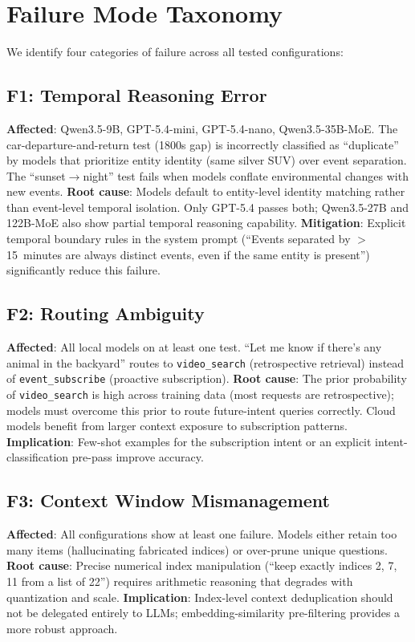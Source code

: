 \documentclass[onecolumn,10pt]{IEEEtran}
\begin{document}

\section{Failure Mode Taxonomy}

We identify four categories of failure across all tested configurations:

\subsection{F1: Temporal Reasoning Error}
\textbf{Affected}: Qwen3.5-9B, GPT-5.4-mini, GPT-5.4-nano, Qwen3.5-35B-MoE.
The car-departure-and-return test (1800s gap) is incorrectly classified
as ``duplicate'' by models that prioritize entity identity (same silver SUV)
over event separation. The ``sunset$\rightarrow$night'' test fails when
models conflate environmental changes with new events.
\textbf{Root cause}: Models default to entity-level identity matching
rather than event-level temporal isolation. Only GPT-5.4 passes both;
Qwen3.5-27B and 122B-MoE also show partial temporal reasoning capability.
\textbf{Mitigation}: Explicit temporal boundary rules in the system
prompt (``Events separated by $>$15~minutes are always distinct events,
even if the same entity is present'') significantly reduce this failure.

\subsection{F2: Routing Ambiguity}
\textbf{Affected}: All local models on at least one test.
``Let me know if there's any animal in the backyard'' routes to
\texttt{video\_search} (retrospective retrieval) instead of
\texttt{event\_subscribe} (proactive subscription).
\textbf{Root cause}: The prior probability of \texttt{video\_search}
is high across training data (most requests are retrospective); models
must overcome this prior to route future-intent queries correctly.
Cloud models benefit from larger context exposure to subscription patterns.
\textbf{Implication}: Few-shot examples for the subscription intent
or an explicit intent-classification pre-pass improve accuracy.

\subsection{F3: Context Window Mismanagement}
\textbf{Affected}: All configurations show at least one failure.
Models either retain too many items (hallucinating fabricated indices)
or over-prune unique questions.
\textbf{Root cause}: Precise numerical index manipulation (``keep
exactly indices 2, 7, 11 from a list of 22'') requires arithmetic
reasoning that degrades with quantization and scale.
\textbf{Implication}: Index-level context deduplication should not be
delegated entirely to LLMs; embedding-similarity pre-filtering
provides a more robust approach.
\end{document}
